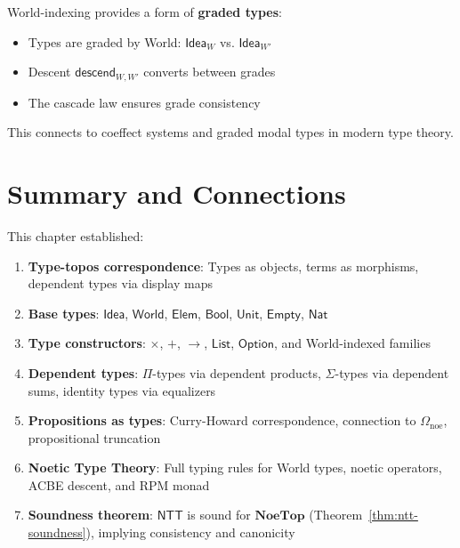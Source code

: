 \begin{remark}
\label{rem:world-graded}
World-indexing provides a form of \textbf{graded types}:
\begin{itemize}
  \item Types are graded by World: $\mathsf{Idea}_W$ vs. $\mathsf{Idea}_{W'}$
  \item Descent $\mathsf{descend}_{W,W'}$ converts between grades
  \item The cascade law ensures grade consistency
\end{itemize}
This connects to coeffect systems and graded modal types in modern type theory.
\end{remark}

\section{Summary and Connections}
\label{sec:internal-language-summary}

\begin{remark}
This chapter established:
\begin{enumerate}
  \item \textbf{Type-topos correspondence}: Types as objects, terms as morphisms,
        dependent types via display maps
  \item \textbf{Base types}: $\mathsf{Idea}$, $\mathsf{World}$, $\mathsf{Elem}$,
        $\mathsf{Bool}$, $\mathsf{Unit}$, $\mathsf{Empty}$, $\mathsf{Nat}$
  \item \textbf{Type constructors}: $\times$, $+$, $\to$, $\mathsf{List}$,
        $\mathsf{Option}$, and World-indexed families
  \item \textbf{Dependent types}: $\Pi$-types via dependent products,
        $\Sigma$-types via dependent sums, identity types via equalizers
  \item \textbf{Propositions as types}: Curry-Howard correspondence, connection
        to $\Omega_{\mathrm{noe}}$, propositional truncation
  \item \textbf{Noetic Type Theory}: Full typing rules for World types, noetic
        operators, ACBE descent, and RPM monad
  \item \textbf{Soundness theorem}: $\mathsf{NTT}$ is sound for $\mathbf{NoeTop}$
        (Theorem~\ref{thm:ntt-soundness}), implying consistency and canonicity
\end{enumerate}
\end{remark}

